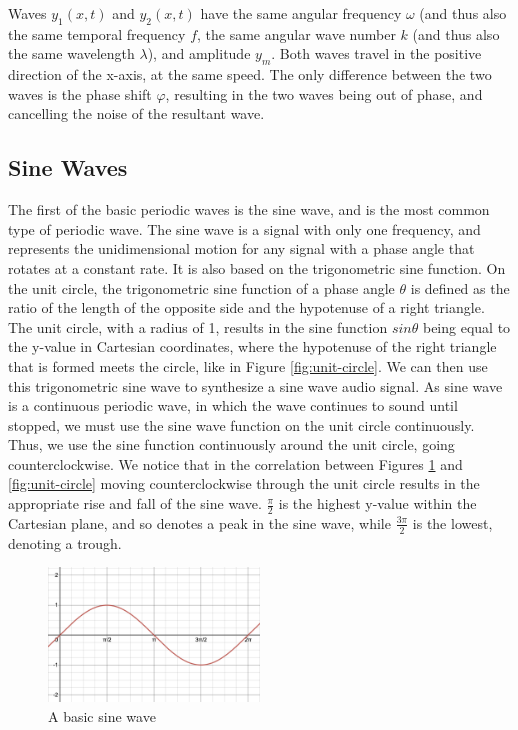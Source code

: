 Waves $y_1(x, t)$ and $y_2(x, t)$ have the same angular frequency $\omega$ (and thus also the same temporal frequency $f$, the same angular wave number $k$ (and thus also the same wavelength $\lambda$), and amplitude $y_m$. Both waves travel in the positive direction of the x-axis, at the same speed. The only difference between the two waves is the phase shift $\varphi$, resulting in the two waves being out of phase, and cancelling the noise of the resultant wave.

\subsection{Sine Waves}\label{subsection:sine-waves}
The first of the basic periodic waves is the sine wave, and is the most common type of periodic wave. The sine wave is a signal with only one frequency, and represents the unidimensional motion for any signal with a phase angle that rotates at a constant rate. It is also based on the trigonometric sine function. On the unit circle, the trigonometric sine function of a phase angle $\theta$ is defined as the ratio of the length of the opposite side and the hypotenuse of a right triangle. The unit circle, with a radius of 1, results in the sine function $sin\theta$ being equal to the y-value in Cartesian coordinates, where the hypotenuse of the right triangle that is formed meets the circle, like in Figure \ref{fig:unit-circle}. We can then use this trigonometric sine wave to synthesize a sine wave audio signal. As sine wave is a continuous periodic wave, in which the wave continues to sound until stopped, we must use the sine wave function on the unit circle continuously. Thus, we use the sine function continuously around the unit circle, going counterclockwise. We notice that in the correlation between Figures \ref{fig:basic-sine-wave} and \ref{fig:unit-circle} moving counterclockwise through the unit circle results in the appropriate rise and fall of the sine wave. $\frac{\pi}{2}$ is the highest y-value within the Cartesian plane, and so denotes a peak in the sine wave, while $\frac{3\pi}{2}$ is the lowest, denoting a trough.

\begin{figure}[h]
	\centering
	\includegraphics[width=0.5\textwidth]{figures/sine-wave-form.png}
	\caption{A basic sine wave}
	\label{fig:basic-sine-wave}
\end{figure}

